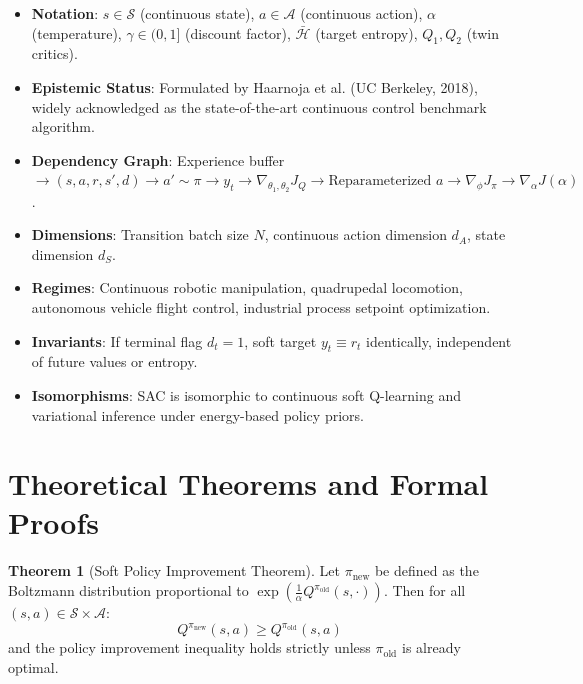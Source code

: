 \documentclass[11pt,a4paper]{article}
\theoremstyle{definition}
\newtheorem{theorem}{\textbf{Theorem}}[section]
\begin{document}
\begin{itemize}
    \item \textbf{Notation}: $s \in \mathcal{S}$ (continuous state), $a \in \mathcal{A}$ (continuous action), $\alpha$ (temperature), $\gamma \in (0, 1]$ (discount factor), $\bar{\mathcal{H}}$ (target entropy), $Q_1, Q_2$ (twin critics).
    \item \textbf{Epistemic Status}: Formulated by Haarnoja et al. (UC Berkeley, 2018), widely acknowledged as the state-of-the-art continuous control benchmark algorithm.
    \item \textbf{Dependency Graph}: Experience buffer $\to (s, a, r, s', d) \to a' \sim \pi \to y_t \to \nabla_{\theta_1, \theta_2} J_Q \to \text{Reparameterized } a \to \nabla_\phi J_\pi \to \nabla_\alpha J(\alpha)$.
    \item \textbf{Dimensions}: Transition batch size $N$, continuous action dimension $d_A$, state dimension $d_S$.
    \item \textbf{Regimes}: Continuous robotic manipulation, quadrupedal locomotion, autonomous vehicle flight control, industrial process setpoint optimization.
    \item \textbf{Invariants}: If terminal flag $d_t = 1$, soft target $y_t \equiv r_t$ identically, independent of future values or entropy.
    \item \textbf{Isomorphisms}: SAC is isomorphic to continuous soft Q-learning and variational inference under energy-based policy priors.
\end{itemize}

\section{Theoretical Theorems and Formal Proofs}

\begin{theorem}[Soft Policy Improvement Theorem]
Let $\pi_{\text{new}}$ be defined as the Boltzmann distribution proportional to $\exp\left(\frac{1}{\alpha} Q^{\pi_{\text{old}}}(s, \cdot)\right)$. Then for all $(s, a) \in \mathcal{S} \times \mathcal{A}$:
{\boldmath
\begin{equation}
Q^{\pi_{\text{new}}}(s, a) \ge Q^{\pi_{\text{old}}}(s, a)
\end{equation}
}
and the policy improvement inequality holds strictly unless $\pi_{\text{old}}$ is already optimal.
\end{theorem}
\end{document}
